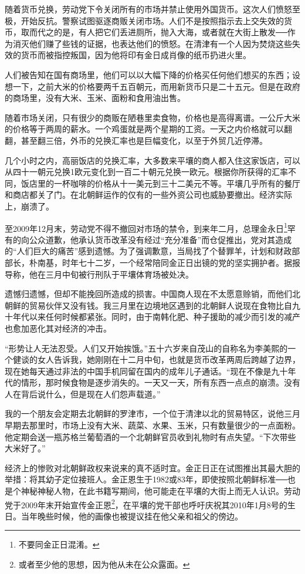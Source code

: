 随着货币兑换，劳动党下令关闭所有的市场并禁止使用外国货币。这次人们愤怒至极，开始反抗。警察试图驱逐商贩关闭市场。人们不是按照指示去上交失效的货币，取而代之的是，有人把它们丢进厕所，抛入大海，或者就在大街上散发──作为消灭他们赚了些钱的证据，也表达他们的愤怒。在清津有一个人因为焚烧这些失效的货币而被指控叛国，因为他将印有金日成肖像的纸币扔进火里。

人们被告知在国有商场里，他们可以以大幅下降的价格买任何他们想买的东西；设想一下，之前大米的价格要两千五百朝元，而用新货币只是二十五元。但是在政府的商场里，没有大米、玉米、面粉和食用油出售。

随着市场关闭，只有很少的商贩在陋巷里卖食物，价格也是高得离谱。一公斤大米的价格等于两周的薪水。一个鸡蛋就是两个星期的工资。一天之内价格就可以翻翻，甚至翻三倍，外币的兑换汇率也是巨幅变化，以至于外贸几近停滞。

几个小时之内，高丽饭店的兑换汇率，大多数来平壤的商人都入住这家饭店，可以从四十一朝元兑换1欧元变化到一百二十朝元兑换一欧元。根据你所获得的汇率不同，饭店里的一杯咖啡的价格从十一美元到三十二美元不等。平壤几乎所有的餐厅和商店都关了门。在北朝鲜运作的仅有的一些外资公司也威胁要撤出。经济实际上，崩溃了。

至2009年12月末，劳动党不得不撤回对市场的禁令，到来年二月，总理金永日\footnote{不要同金正日混淆。}罕有的向公众道歉，他承认货币改革没有经过“充分准备”而仓促推出，党对其造成的“人们巨大的痛苦”感到遗憾。为了强调歉意，当局找了个替罪羊，计划和财政部部长，朴南基，时年七十二岁，一个经常陪同金正日出镜的党的坚实拥护者。据报导称，他在三月中旬被行刑队于平壤体育场被处决。

遗憾归遗憾，但却不能挽回所造成的损害。中国商人现在不太愿意赊销，而他们北朝鲜的贸易伙伴又没有钱。我三月里在边境地区遇到的北朝鲜人说现在食物比自九十年代以来任何时候都紧张。同时，由于南韩化肥、种子援助的减少而引发的减产也愈加恶化其对经济的冲击。

“形势让人无法忍受。人们又开始挨饿。”五十六岁来自茂山的自称名为李美熙的一个健谈的女人告诉我，她刚刚在十二月中旬，也就是货币改革两周后跨越了边界，现在她每天通过非法的中国手机同留在国内的成年儿子通话。“现在不像是九十年代的情形，那时候食物是逐步消失的。一天又一天，所有东西一点点的崩溃。没有人在背后说什么，但是现在人们怨声载道。”

我的一个朋友会定期去北朝鲜的罗津市，一个位于清津以北的贸易特区，说他三月早期去那里时，市场上没有大米、蔬菜、水果、玉米，只有数量很少的一点面粉。他定期会送一瓶苏格兰葡萄酒的一个北朝鲜官员收到礼物时有点失望。“下次带些大米好了。”

经济上的惨败对北朝鲜政权来说来的真不适时宜。金正日正在试图推出其最大胆的举措：将其幼子定位接班人。金正恩生于1982或83年，即使按照北朝鲜标准──也是个神秘神秘人物，在此书籍写期间，他可能走在平壤的大街上而无人认识。劳动党于2009年末开始宣传金正恩\footnote{或者至少他的思想，因为他从未在公众露面。}，在平壤的党干部也呼吁庆祝其2010年1月8号的生日。当年晚些时候，他的画像也被提议挂在他父亲和祖父的傍边。


